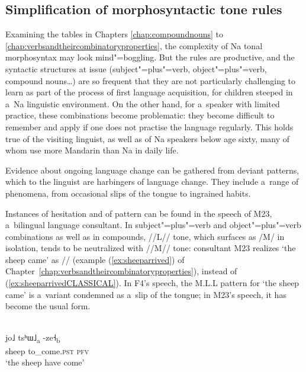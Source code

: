 \subsection{Simplification of morphosyntactic tone rules}
\label{sec:thesimplificationofmorphosyntactictonerules}


Examining the tables in Chapters \ref{chap:compoundnouns} to \ref{chap:verbsandtheircombinatoryproperties}, the complexity of Na tonal morphosyntax may look
mind"=boggling. But the rules are productive, and the syntactic structures at
issue (subject"=plus"=verb, object"=plus"=verb, compound nouns{\dots}) are so frequent that they are not
particularly challenging to learn as part of the process of first language acquisition, for children steeped in a~Na linguistic environment. On the other
hand, for a~speaker with limited practice, these combinations become
problematic: they become difficult to remember and apply if one does not practise the language regularly. This holds true of the visiting linguist, as well as of Na speakers below age sixty, many of whom use more Mandarin than Na in daily life. 

Evidence about ongoing language change can be gathered from deviant patterns, which to the linguist
are harbingers of language change. They include a~range of phenomena, from occasional slips of the
tongue to ingrained habits.

Instances of hesitation and of pattern  can be found in the speech of M23, a~bilingual
language consultant. In subject"=plus"=verb and object"=plus"=verb combinations as well as in compounds, //L// tone, which surfaces as /M/ in isolation, tends to be neutralized with \mbox{//M//} tone: consultant M23
realizes ‘the sheep came’ as // (example (\ref{ex:sheeparrived}) of Chapter~\ref{chap:verbsandtheircombinatoryproperties}), instead of (\ref{ex:sheeparrivedCLASSICAL}). In F4's speech, the M.L.L pattern for ‘the sheep came’ is a~variant condemned as a~slip of the tongue; in M23's speech, it has become the
usual form. 

\begin{exe}
	\ex
	\label{ex:sheeparrivedCLASSICAL}
	\\
	\gll jo˩	tsʰɯ˩\textsubscript{a}	-ze˧\textsubscript{b}\\
	sheep		to\_come.\textsc{pst}		\textsc{pfv}\\
	\glt ‘the sheep have come’
\end{exe}

